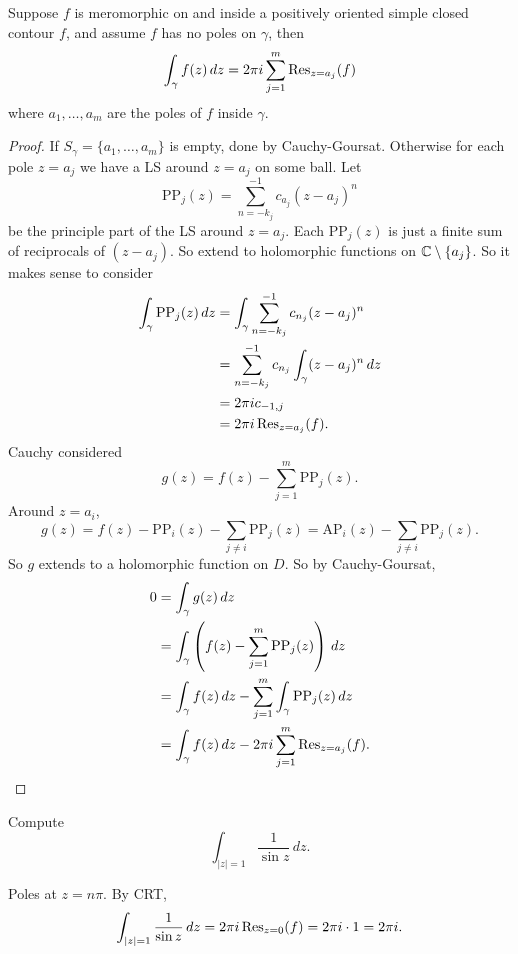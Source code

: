 \documentclass[10pt, a4paper]{article}
\begin{document}
\begin{theorem}
    Suppose $f$ is meromorphic on and inside a positively oriented simple closed contour $f$,
    and assume $f$ has no poles on $\gamma$,
    then
    \[
    \int_{\gamma}f(z)\,dz = 2\pi i\sum_{j = 1}^{m}\operatorname{Res}_{z = a_j}(f)
    \]
    where $a_1, \dotsc, a_m$ are the poles of $f$ inside $\gamma$.

    \begin{proof}
        If $S_{\gamma} = \{a_1, \dotsc, a_m\}$ is empty,
        done by Cauchy-Goursat.
        Otherwise for each pole $z = a_j$ we have a LS around $z = a_j$ on some ball.
        Let
        \[
        \mathrm{PP}_j(z) = \sum_{n = -k_j}^{-1}c_{a_j}(z - a_j) ^ n
        \]
        be the principle part of the LS around $z = a_j$.
        Each $\mathrm{PP}_j(z)$ is just a finite sum of reciprocals of $(z - a_j)$.
        So extend to holomorphic functions on $\mathbb{C} \setminus \{a_j\}$.
        So it makes sense to consider
        \begin{align*}
            \int_{\gamma}\mathrm{PP}_j(z)\,dz &= \int_{\gamma}\sum_{n = -k_j}^{-1}c_{n_j}(z - a_j) ^ n \\
            &= \sum_{n = -k_j}^{-1}c_{n_j}\int_{\gamma}(z - a_j) ^ n\,dz \\
            &= 2\pi ic_{-1, j} \\
            &= 2\pi i\operatorname{Res}_{z = a_j}(f).
        \end{align*}
        Cauchy considered
        \[
        g(z) = f(z) - \sum_{j = 1}^{m}\mathrm{PP}_j(z).
        \]
        Around $z = a_i$,
        \[
        g(z) = f(z) - \mathrm{PP}_i(z) - \sum_{j \neq i}\mathrm{PP}_j(z) = \mathrm{AP}_i(z) - \sum_{j \neq i}\mathrm{PP}_j(z).
        \]
        So $g$ extends to a holomorphic function on $D$.
        So by Cauchy-Goursat,
        \begin{align*}
            0 &= \int_{\gamma}g(z)\,dz \\
            &= \int_{\gamma}\left(f(z) - \sum_{j = 1}^{m}\mathrm{PP}_j(z)\right)\,dz \\
            &= \int_{\gamma}f(z)\,dz - \sum_{j = 1}^{m}\int_{\gamma}\mathrm{PP}_j(z)\,dz \\
            &= \int_{\gamma}f(z)\,dz - 2\pi i\sum_{j = 1}^{m}\operatorname{Res}_{z = a_j}(f).
        \end{align*}
    \end{proof}
\end{theorem}

\begin{example}
    Compute
    \[
    \int_{|z| = 1}\frac{1}{\sin{z}}\,dz.
    \]

    \begin{solution}
        Poles at $z = n\pi$.
        By CRT,
        \[
        \int_{|z| = 1}\frac{1}{\sin{z}}\,dz = 2\pi i\operatorname{Res}_{z = 0}(f) = 2\pi i\cdot 1 = 2\pi i.
        \]
    \end{solution}
\end{example}
\end{document}
